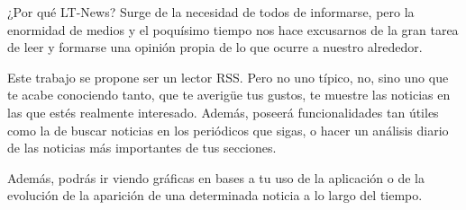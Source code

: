 
¿Por qué LT-News? Surge de la necesidad de todos de informarse, pero la enormidad de medios y el poquísimo tiempo nos hace excusarnos de la gran tarea de leer y formarse una opinión propia de lo que ocurre a nuestro alrededor.

Este trabajo se propone ser un lector RSS. Pero no uno típico, no, sino uno que te acabe conociendo tanto, que te averigüe tus gustos, te muestre las noticias en las que estés realmente interesado. Además, poseerá funcionalidades tan útiles como la de buscar noticias en los periódicos que sigas, o hacer un análisis diario de las noticias más importantes de tus secciones.

Además, podrás ir viendo gráficas en bases a tu uso de la aplicación o de la evolución de la aparición de una determinada noticia a lo largo del tiempo.